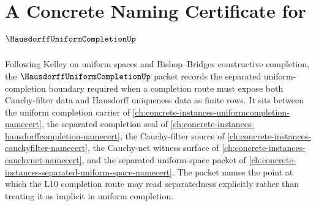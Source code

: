 \chapter{A Concrete Naming Certificate for $\HausdorffUniformCompletionUp$}
\label{ch:concrete-instances-hausdorff-uniform-completion-namecert}

Following Kelley on uniform spaces and Bishop--Bridges constructive completion, the $\HausdorffUniformCompletionUp$ packet records the separated uniform-completion boundary required when a completion route must expose both Cauchy-filter data and Hausdorff uniqueness data as finite rows. It sits between the uniform completion carrier of \autoref{ch:concrete-instances-uniformcompletion-namecert}, the separated completion seal of \autoref{ch:concrete-instances-hausdorffcompletion-namecert}, the Cauchy-filter source of \autoref{ch:concrete-instances-cauchyfilter-namecert}, the Cauchy-net witness surface of \autoref{ch:concrete-instances-cauchynet-namecert}, and the separated uniform-space packet of \autoref{ch:concrete-instances-separated-uniform-space-namecert}. The packet names the point at which the L10 completion route may read separatedness explicitly rather than treating it as implicit in uniform completion.

